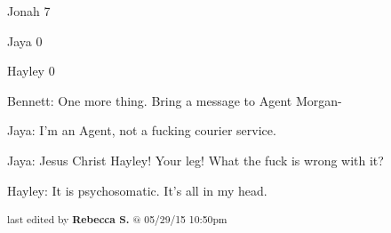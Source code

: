 
Jonah 7

Jaya 0

Hayley 0



Bennett: One more thing.  Bring a message to Agent Morgan-

Jaya: I'm an Agent, not a fucking courier service.



Jaya: Jesus Christ Hayley!  Your leg!  What the fuck is wrong with it?

Hayley: It is psychosomatic.  It's all in my head.


\iffalse

======================
THESE ARE ERRORS ENCOUNTERED DURING THE EXPORT PROCESS
======================

	Unable to highlight for footnote: I think Marechenko wins the Analogy War :) because:GivenExpectedThe faucet will be turned on to full and the water best be hot.The faucet must be turned on to full and the water better be hot.

	Unable to highlight for footnote: He actually said that the vote would go as agreed. Jonah may not have noticed, but he avoided saying he would do anything, or that he knew anything, and except for a few instances left the vote as a hypothetical. because:GivenExpectedIn return, as a gesture of my good faith, the vote will go as agreed.In return, as a gesture of my good faith, I will place my vote as agreed.


\fi

\vspace{\fill}

\begin{flushright}
\textsubscript{last edited by \textbf{Rebecca S.} @ 05/29/15 10:50pm}
\end{flushright}

